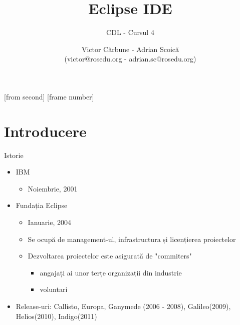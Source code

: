 \documentclass{beamer}
\title[Eclipse IDE]{Eclipse IDE}
\subtitle{CDL - Cursul 4}
\institute[ROSEdu]{ROSEdu}
\author[Adrian|Victor]{Victor Cărbune - Adrian Scoică\\(\small victor@rosedu.org - adrian.sc@rosedu.org)}
\begin{document}
[from second]
[frame number]

\frame{\titlepage}

\begin{frame}
\tableofcontents
\end{frame}

\section{Introducere}


\begin{frame}{Istorie}

\begin{itemize}
  \item IBM
     \begin{itemize}
    \pause  
    \item Noiembrie, 2001
    \end{itemize}
  \pause
  \vspace{4mm} 
  \item Fundația Eclipse
    \begin{itemize}  
    \pause  
    \item Ianuarie, 2004
    \pause
    \item Se ocupă de management-ul, infrastructura și licențierea proiectelor 
    \pause  
    \item Dezvoltarea proiectelor este asigurată de "commiters"
      \begin{itemize}  
      \pause  
      \item angajați ai unor terțe organizații din industrie
      \pause  
      \item voluntari
      \end{itemize}
    \end{itemize}
  \vspace{4mm} 
  \pause  
  \item Release-uri: Callisto, Europa, Ganymede (2006 - 2008), Galileo(2009), Helios(2010), Indigo(2011)
\end{itemize}
\end{frame}
\end{document}
